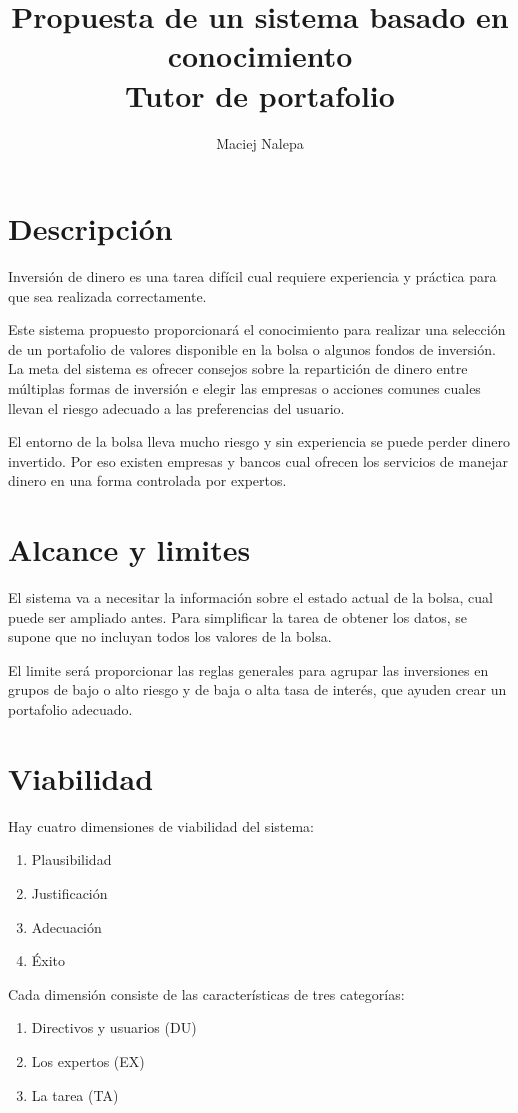 \documentclass[a4paper,12pt]{article}
\title{Propuesta de un sistema basado en conocimiento\\ \normalsize{Tutor de portafolio}}
\author{Maciej Nalepa}
\begin{document}
\maketitle

\section{Descripción}
Inversión de dinero es una tarea difícil cual requiere experiencia y práctica para que sea realizada correctamente.

Este sistema propuesto proporcionará el conocimiento para realizar una selección de un portafolio de valores disponible en la bolsa o algunos fondos de inversión. La meta del sistema es ofrecer consejos sobre la repartición de dinero entre múltiplas formas de inversión e elegir las empresas o acciones comunes cuales llevan el riesgo adecuado a las preferencias del usuario.

El entorno de la bolsa lleva mucho riesgo y sin experiencia se puede perder dinero invertido. Por eso existen empresas y bancos cual ofrecen los servicios de manejar dinero en una forma controlada por expertos.

\section{Alcance y limites}
El sistema va a necesitar la información sobre el estado actual de la bolsa, cual puede ser ampliado antes. Para simplificar la tarea de obtener los datos, se supone que no incluyan todos los valores de la bolsa.

El limite será proporcionar las reglas generales para agrupar las inversiones en grupos de bajo o alto riesgo y de baja o alta tasa de interés, que ayuden crear un portafolio adecuado.

\section{Viabilidad}

\noindent Hay cuatro dimensiones de viabilidad del sistema:
\begin{enumerate}
	\item Plausibilidad
	\item Justificación
	\item Adecuación
	\item Éxito
\end{enumerate}

\noindent Cada dimensión consiste de las características de tres categorías:
\begin{enumerate}
	\item Directivos y usuarios (DU)
	\item Los expertos (EX)
	\item La tarea (TA)
\end{enumerate}
\end{document}
